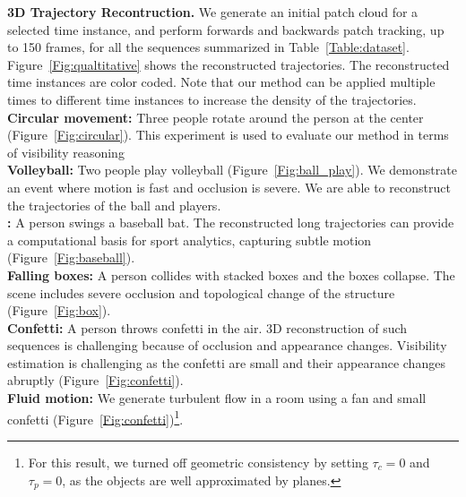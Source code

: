 \noindent \textbf{3D Trajectory Recontruction.}
We generate an initial patch cloud for a selected time instance, and perform forwards and backwards patch tracking, up to 150 frames, for all the sequences summarized in Table~\ref{Table:dataset}. Figure~\ref{Fig:qualtitative} shows the reconstructed trajectories. The reconstructed time instances are color coded. Note that our method can be applied multiple times to different time instances to increase the density of the trajectories. \\
\textbf{Circular movement:} Three people rotate around the person at the center (Figure~\ref{Fig:circular}). This experiment is used to evaluate our method in terms of visibility reasoning\\
\textbf{Volleyball:} Two people play volleyball (Figure~\ref{Fig:ball_play}). We demonstrate an event where motion is fast and occlusion is severe. We are able to reconstruct the trajectories of the ball and players.\\
\textbf{:} A person swings a baseball bat. The reconstructed long trajectories can provide a computational basis for sport analytics, capturing subtle motion (Figure~\ref{Fig:baseball}).\\
\textbf{Falling boxes:} A person collides with stacked boxes and the boxes collapse. The scene includes severe occlusion and topological change of the structure (Figure~\ref{Fig:box}).\\
\textbf{Confetti:} A person throws confetti in the air. 3D reconstruction of such sequences is challenging because of occlusion and appearance changes. Visibility estimation is challenging as the confetti are small and their appearance changes abruptly (Figure~\ref{Fig:confetti}). \\
\textbf{Fluid motion:} We generate turbulent flow in a room using a fan and small confetti (Figure~\ref{Fig:confetti})\footnote{For this result, we turned off geometric consistency by setting $\tau_c = 0$ and $\tau_p = 0$, as the objects are well approximated by planes.}. 

